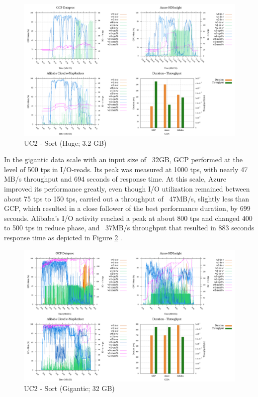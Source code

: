 \documentclass[review]{elsarticle}
\begin{document}
	\begin{figure}[p]
		\caption{UC2 - Sort (Huge; 3.2 GB)}
		\label{fig:uc2-srt-h-cmidt}
		\includegraphics[width=\textwidth]{uc2-srt-h-cmidt}
		\centering
	\end{figure}
	
	In the gigantic data scale with an input size of ~32GB, GCP performed at the level of 500 tps in I/O-reads. Its peak was measured at 1000 tps, with nearly 47 MB/s throughput and 694 seconds of response time. At this scale, Azure improved its performance greatly, even though I/O utilization remained between about 75 tps to 150 tps, carried out a throughput of ~47MB/s, slightly less than GCP, which resulted in a close follower of the best performance duration, by 699 seconds. Alibaba's I/O activity reached a peak at about 800 tps and changed 400 to 500 tps in reduce phase, and ~37MB/s throughput that resulted in 883 seconds response time as depicted in Figure \ref{fig:uc2-srt-g-cmidt} .
	
	\begin{figure}[p]
		\caption{UC2 - Sort (Gigantic; 32 GB)}
		\label{fig:uc2-srt-g-cmidt}
		\includegraphics[width=\textwidth]{uc2-srt-g-cmidt}
		\centering
	\end{figure}
	
\end{document}
